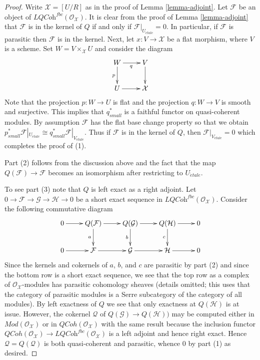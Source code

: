 \documentclass{stacks-project}
\theoremstyle{plain}
\theoremstyle{definition}
\theoremstyle{remark}
\numberwithin{equation}{subsection}
\def\etale{{\acute{e}tale}}
\def\QCoh{\mathit{QCoh}}
\begin{document}
\begin{proof}
Write $\mathcal{X} = [U/R]$ as in the proof of Lemma \ref{lemma-adjoint}.
Let $\mathcal{F}$ be an object of
$\textit{LQCoh}^{fbc}(\mathcal{O}_\mathcal{X})$.
It is clear from the proof of Lemma \ref{lemma-adjoint}
that $\mathcal{F}$ is in the kernel of $Q$ if and only if
$\mathcal{F}|_{U_\etale} = 0$.
In particular, if $\mathcal{F}$ is parasitic then $\mathcal{F}$ is in
the kernel. Next, let $x : V \to \mathcal{X}$ be a flat morphism, where
$V$ is a scheme. Set $W = V \times_\mathcal{X} U$ and consider the diagram
$$
\xymatrix{
W \ar[d]_p \ar[r]_q & V \ar[d] \\
U \ar[r] & \mathcal{X}
}
$$
Note that the projection $p : W \to U$ is flat and the projection
$q : W \to V$ is smooth and surjective. This implies that $q_{small}^*$
is a faithful functor on quasi-coherent modules. By assumption $\mathcal{F}$
has the flat base change property so that we obtain
$p_{small}^*\mathcal{F}|_{U_\etale} \cong
q_{small}^*\mathcal{F}|_{V_\etale}$. Thus if $\mathcal{F}$
is in the kernel of $Q$, then $\mathcal{F}|_{V_\etale} = 0$
which completes the proof of (1).

\medskip\noindent
Part (2) follows from the discussion above and the fact
that the map $Q(\mathcal{F}) \to \mathcal{F}$ becomes an isomorphism after
restricting to $U_\etale$.

\medskip\noindent
To see part (3) note that $Q$ is left exact as a right adjoint.
Let $0 \to \mathcal{F} \to \mathcal{G} \to \mathcal{H} \to 0$
be a short exact sequence in $\textit{LQCoh}^{fbc}(\mathcal{O}_\mathcal{X})$.
Consider the following commutative diagram
$$
\xymatrix{
0 \ar[r] &
Q(\mathcal{F}) \ar[r] \ar[d]_a &
Q(\mathcal{G}) \ar[r] \ar[d]_b &
Q(\mathcal{H}) \ar[r] \ar[d]_c & 0 \\
0 \ar[r] &
\mathcal{F} \ar[r] &
\mathcal{G} \ar[r] &
\mathcal{H} \ar[r] & 0
}
$$
Since the kernels and cokernels of $a$, $b$, and $c$ are parasitic by
part (2) and since the bottom row is a short exact sequence, we see that
the top row as a complex of $\mathcal{O}_\mathcal{X}$-modules has parasitic
cohomology sheaves (details omitted; this uses that the category of
parasitic modules is a Serre subcategory of the category of all modules).
By left exactness of $Q$ we see that only exactness at $Q(\mathcal{H})$
is at issue. However, the cokernel $\mathcal{Q}$ of
$Q(\mathcal{G}) \to Q(\mathcal{H}))$
may be computed either in $\textit{Mod}(\mathcal{O}_\mathcal{X})$
or in $\QCoh(\mathcal{O}_\mathcal{X})$ with the same result because
the inclusion functor $\QCoh(\mathcal{O}_\mathcal{X}) \to
\textit{LQCoh}^{fbc}(\mathcal{O}_\mathcal{X})$
is a left adjoint and hence right exact. Hence $\mathcal{Q} = Q(\mathcal{Q})$
is both quasi-coherent and parasitic, whence $0$ by part (1) as desired.


\end{proof}
\end{document}
